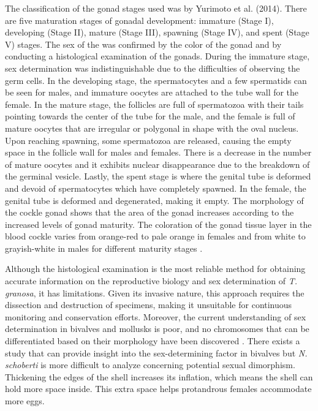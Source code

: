 The classification of the gonad stages used was by Yurimoto et al. (2014). There are five maturation stages of gonadal development: immature (Stage I), developing (Stage II), mature (Stage III), spawning (Stage IV), and spent (Stage V) stages. The sex of the \Tgranosa was confirmed by the color of the gonad and by conducting a histological examination of the gonads. During the immature stage, sex determination was indistinguishable due to the difficulties of observing the germ cells. In the developing stage, the spermatocytes and a few spermatids can be seen for males, and immature oocytes are attached to the tube wall for the female. In the mature stage, the follicles are full of spermatozoa with their tails pointing towards the center of the tube for the male, and the female is full of mature oocytes that are irregular or polygonal in shape with the oval nucleus. Upon reaching spawning, some spermatozoa are released, causing the empty space in the follicle wall for males and females. There is a decrease in the number of mature oocytes and it exhibits nuclear disappearance due to the breakdown of the germinal vesicle. Lastly, the spent stage is where the genital tube is deformed and devoid of spermatocytes which have completely spawned. In the female, the genital tube is deformed and degenerated, making it empty. The morphology of the cockle gonad shows that the area of the gonad increases according to the increased levels of gonad maturity. The coloration of the gonad tissue layer in the blood cockle varies from orange-red to pale orange in females and from white to grayish-white in males for different maturity stages \cite{may2021}. 

Although the histological examination is the most reliable method for obtaining accurate information on the reproductive biology and sex determination of \textit{T. granosa}, it has limitations. Given its invasive nature, this approach requires the dissection and destruction of specimens, making it unsuitable for continuous monitoring and conservation efforts. Moreover, the current understanding of sex determination in bivalves and mollusks is poor, and no chromosomes that can be differentiated based on their morphology have been discovered \cite{afiati2007}. There exists a study that can provide insight into the sex-determining factor in bivalves but  \textit{N. schoberti} is more difficult to analyze concerning potential sexual dimorphism. Thickening the edges of the shell increases its inflation, which means the shell can hold more space inside. This extra space helps protandrous females accommodate more eggs.

